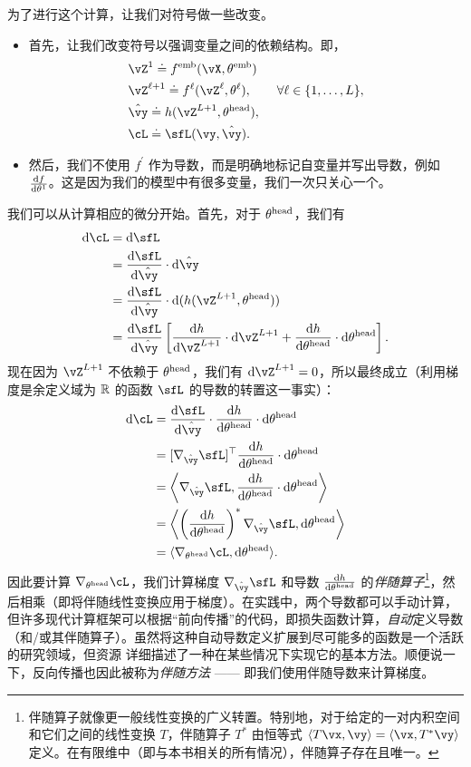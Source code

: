 \documentclass[../../book-main.tex]{subfiles}
\begin{document}
为了进行这个计算，让我们对符号做一些改变。
\begin{itemize}
    \item 首先，让我们改变符号以强调变量之间的依赖结构。即，
    \begin{align}
        &\vZ^{1} \doteq f^{\emb}(\vX, \theta^{\emb}) \\ 
        &\vZ^{\ell + 1} \doteq f^{\ell}(\vZ^{\ell}, \theta^{\ell}), \qquad \forall \ell \in \{1, \dots, L\}, \\
        &\hat{\vy} \doteq h(\vZ^{L+1}, \theta^{\head}), \\ 
        &\cL \doteq \sfL(\vy, \hat{\vy}).
    \end{align}
    \item 然后，我们不使用 \(f^{\prime}\) 作为导数，而是明确地标记自变量并写出导数，例如 \(\odv{f}{\theta^{1}}\)。这是因为我们的模型中有很多变量，我们一次只关心一个。
\end{itemize}
我们可以从计算相应的微分开始。首先，对于 \(\theta^{\mathrm{head}}\)，我们有
\begin{align}
    \odif{\cL}
    &= \odif{\sfL} \\ 
    &= \odv{\sfL}{\hat{\vy}}\cdot\odif{\hat{\vy}} \\ 
    &= \odv{\sfL}{\hat{\vy}}\cdot\odif{{(h(\vZ^{L + 1}, \theta^{\head}))}} \\ 
    &= \odv{\sfL}{\hat{\vy}}\bs{\odv{h}{\vZ^{L + 1}}\cdot\odif{\vZ}^{L + 1} + \odv{h}{\theta^{\head}}\cdot\odif{\theta}^{\head}}.
\end{align}
现在因为 \(\vZ^{L + 1}\) 不依赖于 \(\theta^{\mathrm{head}}\)，我们有 \(\odif{\vZ}^{L + 1} = 0\)，所以最终成立（利用梯度是余定义域为 \(\mathbb{R}\) 的函数 \(\sfL\) 的导数的转置这一事实）：
\begin{align}
    \odif{\cL} 
    &= \odv{\sfL}{\hat{\vy}}\cdot\odv{h}{\theta^{\head}}\cdot\odif{\theta}^{\head} \\ 
    &= [\nabla_{\hat{\vy}}\sfL]^{\top}\odv{h}{\theta^{\head}}\cdot\odif{\theta}^{\head} \\ 
    &= \ip*{\nabla_{\hat{\vy}}\sfL}{\odv{h}{\theta^{\head}}\cdot\odif{\theta}^{\head}} \\
    &= \ip*{\bp{\odv{h}{\theta^{\head}}}^{*}\nabla_{\hat{\vy}}\sfL}{\odif{\theta}^{\head}} \\ 
    &= \ip{\nabla_{\theta^{\head}}\cL}{\odif{\theta}^{\head}}.
\end{align}
因此要计算 \(\nabla_{\theta^{\head}}\cL\)，我们计算梯度 \(\nabla_{\hat{\vy}}\sfL\) 和导数 \(\odv{h}{\theta^{\head}}\) 的\textit{伴随算子}\footnote{伴随算子就像更一般线性变换的广义转置。特别地，对于给定的一对内积空间和它们之间的线性变换 \(T\)，伴随算子 \(T^{*}\) 由恒等式 \(\ip{T\vx}{\vy} = \ip{\vx}{T^{*}\vy}\) 定义。在有限维中（即与本书相关的所有情况），伴随算子存在且唯一。}，然后相乘（即将伴随线性变换应用于梯度）。在实践中，两个导数都可以手动计算，但许多现代计算框架可以根据“前向传播”的代码，即损失函数计算，\textit{自动}定义导数（和/或其伴随算子）。虽然将这种自动导数定义扩展到尽可能多的函数是一个活跃的研究领域，但资源 \cite{bright2025matrix} 详细描述了一种在某些情况下实现它的基本方法。顺便说一下，反向传播也因此被称为\textit{伴随方法} —— 即我们使用伴随导数来计算梯度。
\end{document}

